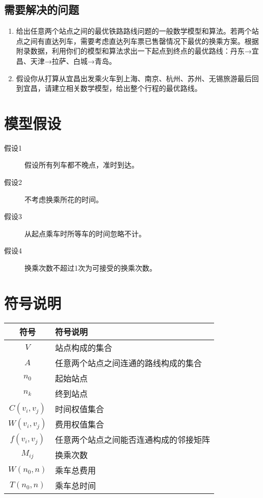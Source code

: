 \documentclass[UTF8]{ctexart}
\begin{document}
\subsection{需要解决的问题}
\begin{enumerate}
  \item 给出任意两个站点之间的最优铁路路线问题的一般数学模型和算法。若两个站点之间有直达列车，需要考虑直达列车票已售罄情况下最优的换乘方案。根据附录数据，利用你们的模型和算法求出一下起点到终点的最优路线：丹东→宜昌、天津→拉萨、白城→青岛。
  \item 假设你从打算从宜昌出发乘火车到上海、南京、杭州、苏州、无锡旅游最后回到宜昌，请建立相关数学模型，给出整个行程的最优路线。
\end{enumerate}

\section{模型假设}
\begin{description}
  \item[假设1] 假设所有列车都不晚点，准时到达。
  \item[假设2] 不考虑换乘所花的时间。
  \item[假设3] 从起点乘车时所等车的时间忽略不计。
  \item[假设4] 换乘次数不超过1次为可接受的换乘次数。
\end{description}

\section{符号说明}
\begin{table}[h]
  \centering
  \begin{tabular}{cl}
     \toprule
     符号 & 符号说明 \\
     \midrule
     $V$ & 站点构成的集合 \\
     $A$ & 任意两个站点之间连通的路线构成的集合 \\
     $n_0$ & 起始站点 \\
     $n_k$ & 终到站点 \\
     $C(v_i,v_j)$ & 时间权值集合 \\
     $W(v_i,v_j)$ & 费用权值集合 \\
     $f(v_i,v_j)$ & 任意两个站点之间能否连通构成的邻接矩阵 \\
     $M_{ij}$ & 换乘次数 \\
     $W(n_0,n)$ & 乘车总费用 \\
     $T(n_0,n)$ & 乘车总时间 \\
     \bottomrule
   \end{tabular}
\end{table}
\end{document}
